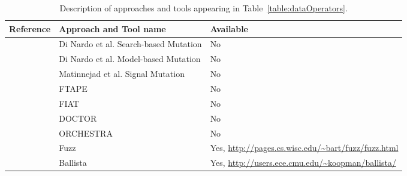 
\begin{table}[ht]
\tiny
\caption{Description of approaches and tools appearing in Table~\ref{table:dataOperators}.}
\begin{center}
\begin{tabular}{|p{1cm}|p{4cm}|p{8cm}|}
\hline
\textbf{Reference} & \textbf{Approach and Tool name} & \textbf{Available} \\
\hline

\cite{di2015evolutionary}	& Di Nardo et al. Search-based Mutation & No \\
\cite{di2015generating} & Di Nardo et al. Model-based Mutation & No \\
\cite{Matinnejad19} & Matinnejad et al. Signal Mutation & No \\

\cite{tsai1999stress} & FTAPE & No\\
\cite{barton1990fault} & FIAT & No \\
\cite{han1995doctor} & DOCTOR & No \\
\cite{dawson1996testing} & ORCHESTRA & No \\

\cite{miller1995fuzz} & Fuzz & Yes, \url{http://pages.cs.wisc.edu/~bart/fuzz/fuzz.html} \\


\cite{koopman2000exception}	&  Ballista & Yes, \url{http://users.ece.cmu.edu/~koopman/ballista/} \\


\end{tabular}
\end{center}
\end{table}
